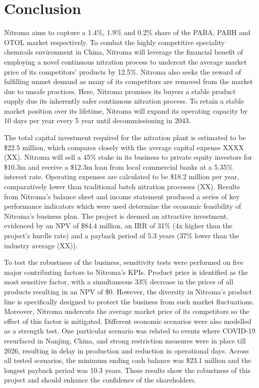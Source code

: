 \section{Conclusion}
Nitroma aims to capture a 1.4\%, 1.9\% and 0.2\% share of the PABA, PABH and OTOL market respectively. To combat the highly competitive speciality chemicals environment in China, Nitroma will leverage the financial benefit of employing a novel continuous nitration process to undercut the average market price of its competitors’ products by 12.5\%. Nitroma also seeks the reward of fulfilling unmet demand as many of its competitors are removed from the market due to unsafe practices. Here, Nitroma promises its buyers a stable product supply due its inherently safer continuous nitration process. To retain a stable market position over its lifetime, Nitroma will expand its operating capacity by 10 days per year every 5 year until decommissioning in 2043.

The total capital investment required for the nitration plant is estimated to be \$22.5 million, which compares closely with the average capital expense XXXX (XX). Nitroma will sell a 45\% stake in its business to private equity investors for \$10.3m and receive a \$12.3m loan from local commercial banks at a 5.35\% interest rate. Operating expenses are calculated to be \$18.2 million per year, comparatively lower than traditional batch nitration processes (XX).  Results from Nitroma’s balance sheet and income statement produced a series of key performance indicators which were used determine the economic feasibility of Nitroma’s business plan. The project is deemed an attractive investment, evidenced by an NPV of \$84.4 million, an IRR of 31\% (4x higher than the project’s hurdle rate) and a payback period of 5.3 years (37\% lower than the industry average (XX)).

To test the robustness of the business, sensitivity tests were performed on five major contributing factors to Nitroma’s KPIs. Product price is identified as the most sensitive factor, with a simultaneous 33\% decrease in the prices of all products resulting in an NPV of \$0. However, the diversity in Nitroma’s product line is specifically designed to protect the business from such market fluctuations. Moreover, Nitroma undercuts the average market price of its competitors so the effect of this factor is mitigated. Different economic scenarios were also modelled as a strength test. One particular scenario was related to events where COVID-19 resurfaced in Nanjing, China, and strong restriction measures were in place till 2026, resulting in delay in production and reduction in operational days. Across all tested scenarios, the minimum ending cash balance was \$23.1 million and the longest payback period was 10.3 years. These results show the robustness of this project and should enhance the confidence of the shareholders.